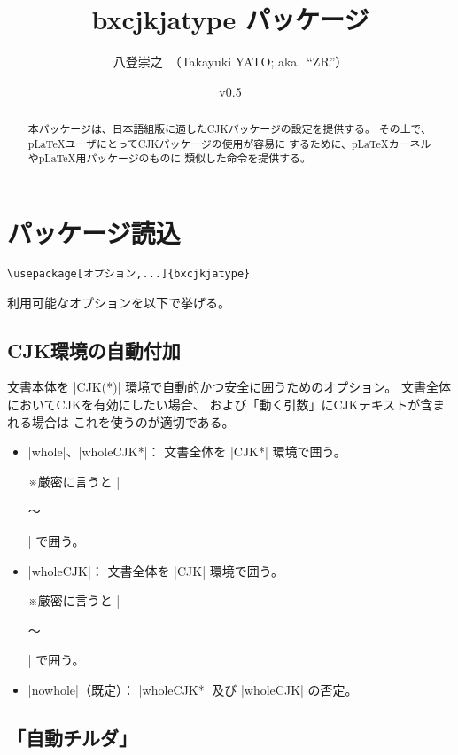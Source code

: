 \documentclass[a4paper]{ltjsarticle}
\newcommand{\PkgVersion}{0.5}
\newcommand{\PkgDate}{2023/07/23}
\newcommand{\Pkg}[1]{\textsf{#1}}
\newcommand{\Note}{\par\noindent ※}
\newcommand{\Means}{：\quad}
\providecommand{\pLaTeX}{p\LaTeX}
\begin{document}
\title{\Pkg{bxcjkjatype} パッケージ}
\author{八登崇之\ （Takayuki YATO; aka.~``ZR''）}
\date{v\PkgVersion\quad[\PkgDate]}
\maketitle

\begin{abstract}
本パッケージは、日本語組版に適した\Pkg{CJK}パッケージの設定を提供する。
その上で、{\pLaTeX}ユーザにとって\Pkg{CJK}パッケージの使用が容易に
するために、{\pLaTeX}カーネルや{\pLaTeX}用パッケージのものに
類似した命令を提供する。
\end{abstract}

\tableofcontents

\section{パッケージ読込}
\label{sec:loading}

\begin{verbatim}
\usepackage[オプション,...]{bxcjkjatype}
\end{verbatim}

利用可能なオプションを以下で挙げる。

\subsection{CJK環境の自動付加}

文書本体を |CJK(*)| 環境で自動的かつ安全に囲うためのオプション。
文書全体においてCJKを有効にしたい場合、
および「動く引数」にCJKテキストが含まれる場合は
これを使うのが適切である。

\begin{itemize}
\item |whole|、|wholeCJK*|\Means
  文書全体を |CJK*| 環境で囲う。
  \Note 厳密に言うと |\begin{uCJK*}～\end{uCJK*}| で囲う。
\item |wholeCJK|\Means
  文書全体を |CJK| 環境で囲う。
  \Note 厳密に言うと |\begin{uCJK}～\end{uCJK}| で囲う。
\item |nowhole|（既定）\Means
  |wholeCJK*| 及び |wholeCJK| の否定。
\end{itemize}

\subsection{「自動チルダ」}
\end{document}
